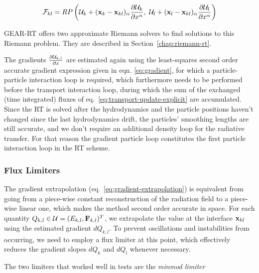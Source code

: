 \begin{align}
    \mathcal{F}_{kl}
    = RP
    \left(\mathcal{U}_k + (\mathbf{x}_{k} - \mathbf{x}_{kl})_\alpha \frac{\partial \mathcal{U}_k}{\partial x^\alpha}, \
    \mathcal{U}_l + (\mathbf{x}_{l} - \mathbf{x}_{kl})_\alpha \frac{\partial \mathcal{U}_l}{\partial x^\alpha} \right) \label{eq:rt-riemann-problem}
\end{align}


GEAR-RT offers two approximate Riemann solvers to find solutions to this Riemann problem. They
are described in Section~\ref{chap:riemann-rt}.

The gradients $\frac{\partial \mathcal{U}_{k,l}}{\partial x}$ are estimated again using the least-squares second order accurate
gradient expression given in eqn. \ref{eq:gradient}, for which a particle-particle interaction loop
is required, which furthermore needs to be performed before the transport interaction loop, during
which the sum of the exchanged (time integrated) fluxes of eq.~\ref{eq:transport-update-explicit}
are accumulated. Since the RT is solved after the hydrodynamics and the particle positions haven't
changed since the last hydrodynamics drift, the particles' smoothing lengths are still accurate, and
we don't require an additional density loop for the radiative transfer. For that reason the gradient
particle loop constitutes the first particle interaction loop in the RT scheme.




\subsubsection{Flux Limiters}

The gradient extrapolation (eq.~\ref{eq:gradient-extrapolation}) is equivalent from going from a
piece-wise constant reconstruction of the radiation field to a piece-wise linear one, which makes
the method second order accurate in space. For each quantity $Q_{k,l} \in \mathcal{U} = (E_{k,l},
\mathbf{F}_{k,l})^T$, we extrapolate the value at the interface $\mathbf{x}_{kl}$ using the estimated gradient
$dQ_{k,l}$. To prevent oscillations and instabilities from occurring, we need to employ a flux
limiter at this point, which effectively reduces the gradient slopes $dQ_k$ and $dQ_l$ whenever
necessary.


The two limiters that worked well in tests are the \emph{minmod limiter}

